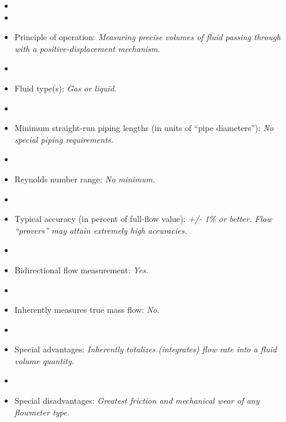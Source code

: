 \begin{itemize}
\goodbreak
\item{} 
\vskip 5pt
\item\item{} Principle of operation: {\it Measuring precise volumes of fluid passing through with a positive-displacement mechanism.}
\vskip 5pt
\item\item{} Fluid type(s): {\it Gas or liquid.}
\vskip 5pt
\item\item{} Minimum straight-run piping lengths (in units of ``pipe diameters''): {\it No special piping requirements.}
\vskip 5pt
\item\item{} Reynolds number range: {\it No minimum.}
\vskip 5pt
\item\item{} Typical accuracy (in percent of full-flow value): {\it +/- 1\% or better.  Flow ``provers'' may attain extremely high accuracies.}
\vskip 5pt
\item\item{} Bidirectional flow measurement: {\it Yes.}
\vskip 5pt
\item\item{} Inherently measures true mass flow: {\it No.}
\vskip 5pt
\item\item{} Special advantages: {\it Inherently totalizes (integrates) flow rate into a fluid volume quantity.}
\vskip 5pt
\item\item{} Special disadvantages: {\it Greatest friction and mechanical wear of any flowmeter type.}
\end{itemize}

